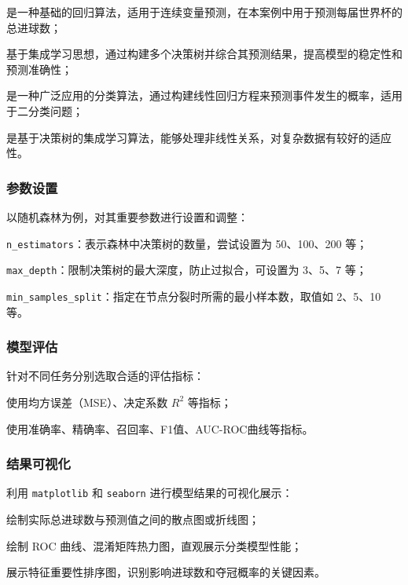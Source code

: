 \documentclass[UTF8]{ctexart}
\begin{document}
\begin{description}[leftmargin=3cm]
	\item[\textbf{线性回归}] 是一种基础的回归算法，适用于连续变量预测，在本案例中用于预测每届世界杯的总进球数；
	\item[\textbf{随机森林回归}] 基于集成学习思想，通过构建多个决策树并综合其预测结果，提高模型的稳定性和预测准确性；
	\item[\textbf{逻辑回归}] 是一种广泛应用的分类算法，通过构建线性回归方程来预测事件发生的概率，适用于二分类问题；
	\item[\textbf{随机森林分类器}] 是基于决策树的集成学习算法，能够处理非线性关系，对复杂数据有较好的适应性。
\end{description}

\subsubsection*{参数设置}
以随机森林为例，对其重要参数进行设置和调整：


\texttt{n\_estimators}：表示森林中决策树的数量，尝试设置为 50、100、200 等；

\texttt{max\_depth}：限制决策树的最大深度，防止过拟合，可设置为 3、5、7 等；

\texttt{min\_samples\_split}：指定在节点分裂时所需的最小样本数，取值如 2、5、10 等。


\subsubsection*{模型评估}
针对不同任务分别选取合适的评估指标：

\begin{description}[leftmargin=3cm]
	\item[回归任务（总进球数预测）] 使用均方误差（MSE）、决定系数 $ R^2 $ 等指标；
	\item[分类任务（国家夺冠预测）] 使用准确率、精确率、召回率、F1值、AUC-ROC曲线等指标。
\end{description}

\subsubsection*{结果可视化}
利用 \texttt{matplotlib} 和 \texttt{seaborn} 进行模型结果的可视化展示：


绘制实际总进球数与预测值之间的散点图或折线图；

绘制 ROC 曲线、混淆矩阵热力图，直观展示分类模型性能；

展示特征重要性排序图，识别影响进球数和夺冠概率的关键因素。
\end{document}
